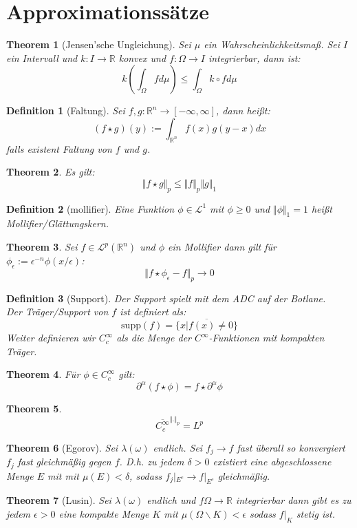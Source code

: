 \documentclass[10pt,a4paper]{article}
\newtheorem{theorem}{Theorem}
\newtheorem{definition}{Definition}
\begin{document}
\section{Approximationssätze}
\begin{theorem}[Jensen'sche Ungleichung]
	Sei $\mu$ ein Wahrscheinlichkeitsmaß. Sei $I$ ein Intervall und $k: I \to \mathbb{R}$ konvex und $f: \Omega \to I$ integrierbar, dann ist: 
	$$k(\int_\Omega f d\mu) \leq \int_\Omega k\circ f d\mu$$
\end{theorem}
\begin{definition}[Faltung]
	Sei $f,g: \mathbb{R}^n \to [-\infty, \infty]$, dann heißt:
	$$(f\star g )(y) := \int_{\mathbb{R}^n}f(x)g(y-x)dx$$
	falls existent Faltung von $f$ und $g$.
\end{definition}
\begin{theorem}
	Es gilt:
	$$\Vert f\star g\Vert_p \leq \Vert f\Vert_p\Vert g\Vert_1$$
\end{theorem}
\begin{definition}[mollifier]
	Eine Funktion $\phi\in\mathcal{L}^1 $ mit $\phi\geq 0$ und $\Vert \phi \Vert_1 = 1$ heißt Mollifier/Glättungskern.
\end{definition}
\begin{theorem}
	Sei $f\in \mathcal{L}^p(\mathbb{R}^n)$ und $\phi$ ein Mollifier dann gilt für $\phi_\epsilon:= \epsilon^{-n}\phi(x/\epsilon)$:
	$$\Vert f\star \phi_\epsilon -f\Vert_p \to 0$$
\end{theorem}
\begin{definition}[Support]
	Der Support spielt mit dem ADC auf der Botlane. \\
	Der Träger/Support von $f$ ist definiert als:
	$$\text{supp}(f) = \overline{\{x | f(x) \neq 0\}}$$
	Weiter definieren wir $C^\infty_c$ als die Menge der $C^\infty$-Funktionen mit kompakten Träger.
\end{definition}
\begin{theorem}
	Für $\phi \in C_c^\infty$ gilt:
	$$\partial^\alpha(f\star \phi) = f\star \partial^\alpha\phi$$
\end{theorem}
\begin{theorem}
	$$\overline{C_c^\infty}^{\Vert . \Vert_p} = L^p$$
\end{theorem}
\begin{theorem}[Egorov]
	Sei $\lambda(\omega)$ endlich. Sei $f_j \to f$ fast überall so konvergiert $f_j$ fast gleichmäßig gegen $f$. D.h. zu jedem $\delta > 0$ existiert eine abgeschlossene Menge $E$ mit mit $\mu(E) < \delta$, sodass $f_j|_{E^c} \to f|_{E^c}$ gleichmäßig.
\end{theorem}
\begin{theorem}[Lusin]
	Sei $\lambda(\omega)$ endlich und $f \Omega \to \mathbb{R}$ integrierbar dann gibt es zu jedem $\epsilon > 0$ eine kompakte Menge $K$ mit $\mu(\Omega\backslash K) < \epsilon$ sodass $f|_K$ stetig ist.  
\end{theorem}
\end{document}
